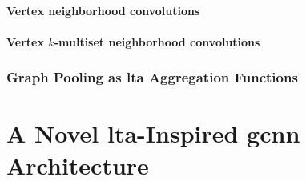 \paragraph{Vertex neighborhood convolutions}

\paragraph{Vertex $k$-multiset neighborhood convolutions}

\subsubsection{Graph Pooling as \ac*{lta} Aggregation Functions}

\section{A Novel \acs*{lta}-Inspired \acs*{gcnn} Architecture}%
\label{sec:ltag:wl2gnn}

